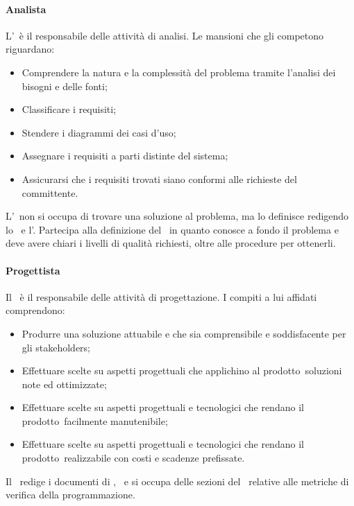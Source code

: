 \documentclass[../NormeProgetto.tex]{subfiles}
\begin{document}
			\paragraph{Analista}
			L'\analista\ è il responsabile delle attività di analisi. Le mansioni che gli competono riguardano:
			\begin{itemize}
			\item Comprendere la natura e la complessità del problema tramite l'analisi dei bisogni e delle fonti;
			\item Classificare i requisiti;
			\item Stendere i diagrammi dei casi d'uso;
			\item Assegnare i requisiti a parti distinte del sistema;
			\item Assicurarsi che i requisiti trovati siano conformi alle richieste del committente.
			\end{itemize}
			L'\analista\ non si occupa di trovare una soluzione al problema, ma lo definisce redigendo lo \studiodifattibilita\ e l'\analisideirequisiti. Partecipa alla definizione del \pianodiqualifica\ in quanto conosce a fondo il problema e deve avere chiari i livelli di qualità richiesti, oltre alle procedure per ottenerli. 
			\paragraph{Progettista}
			Il \progettista\ è il responsabile delle attività di progettazione. I compiti a lui affidati comprendono:
			\begin{itemize}
			\item Produrre una soluzione attuabile e che sia comprensibile e soddisfacente per gli stakeholders;
			\item Effettuare scelte su aspetti progettuali che applichino al prodotto\g\ soluzioni note ed ottimizzate;
			\item Effettuare scelte su aspetti progettuali e tecnologici che rendano il prodotto\g\ facilmente manutenibile;
			\item Effettuare scelte su aspetti progettuali e tecnologici che rendano il prodotto\g\ realizzabile con costi e scadenze prefissate.
			\end{itemize}
			Il \progettista\ redige i documenti di \specificatecnica, \ e si occupa delle sezioni del \pianodiqualifica\ relative alle metriche di verifica della programmazione.
\end{document}
